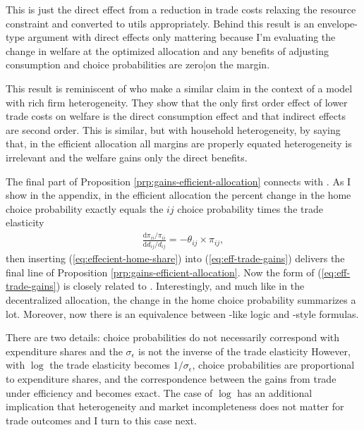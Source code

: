 \documentclass[12pt,pdftex]{article}
\begin{document}
\begin{onehalfspacing}
This is just the direct effect from a reduction in trade costs relaxing the resource constraint and converted to utils appropriately. Behind this result is an envelope-type argument with direct effects only mattering because I'm evaluating the change in welfare at the optimized allocation and any benefits of adjusting consumption and choice probabilities are zero|on the margin.

This result is reminiscent of \citet{AtkesonBurstein2010} who make a similar claim in the context of a model with rich firm heterogeneity. They show that the only first order effect of lower trade costs on welfare is the direct consumption effect and that indirect effects are second order. This is similar, but with household heterogeneity, by saying that, in the efficient allocation all margins are properly equated heterogeneity is irrelevant and the welfare gains only the direct benefits.

The final part of Proposition \ref{prp:gains-efficient-allocation} connects with \citet{arkolakis2012new}. As I show in the appendix, in the efficient allocation the percent change in the home choice probability exactly equals the $ij$ choice probability times the trade elasticity
\begin{align}
\frac{\mathrm{d} \pi_{ii} / \pi_{ii}}{\mathrm{d} d_{ij} / d_{ij}} = -\theta_{ij} \times \pi_{ij},
\label{eq:effecient-home-share}
\end{align}
then inserting (\ref{eq:effecient-home-share}) into  (\ref{eq:eff-trade-gains}) delivers the final line of Proposition \ref{prp:gains-efficient-allocation}. Now the form of (\ref{eq:eff-trade-gains}) is closely related to \citet{arkolakis2012new}. Interestingly, and much like in the decentralized allocation, the change in the home choice probability summarizes a lot. Moreover, now there is an equivalence between \citet{AtkesonBurstein2010}-like logic and \citet{arkolakis2012new}-style formulas.

There are two details: choice probabilities do not necessarily correspond with expenditure shares and the $\sigma_{\epsilon}$ is not the inverse of the trade elasticity However, with $\log$ the trade elasticity becomes $1 / \sigma_{\epsilon}$, choice probabilities are proportional to expenditure shares, and the correspondence between the gains from trade under efficiency and \citet{arkolakis2012new} becomes exact. The case of $\log$ has an additional implication that heterogeneity and market incompleteness does not matter for trade outcomes and I turn to this case next.


\end{onehalfspacing}
\end{document}
